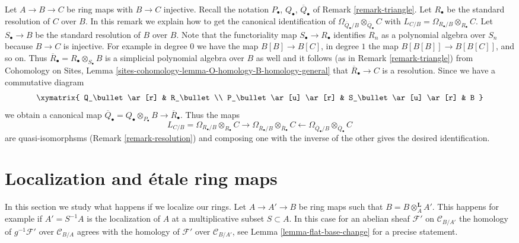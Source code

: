 \begin{remark}
\label{remark-explicit-map}
Let $A \to B \to C$ be ring maps with $B \to C$ injective.
Recall the notation $P_\bullet$, $Q_\bullet$, $\overline{Q}_\bullet$ of
Remark \ref{remark-triangle}.
Let $R_\bullet$ be the standard resolution of $C$ over $B$.
In this remark we explain how to get the canonical identification
of $\Omega_{\overline{Q}_\bullet/B} \otimes_{\overline{Q}_\bullet} C$
with $L_{C/B} = \Omega_{R_\bullet/B} \otimes_{R_\bullet} C$.
Let $S_\bullet \to B$ be the standard resolution of $B$ over $B$.
Note that the functoriality map $S_\bullet \to R_\bullet$ identifies
$R_n$ as a polynomial algebra over $S_n$ because $B \to C$ is injective.
For example in degree $0$ we have the map $B[B] \to B[C]$, in degree
$1$ the map $B[B[B]] \to B[B[C]]$, and so on. Thus
$\overline{R}_\bullet = R_\bullet \otimes_{S_\bullet} B$
is a simplicial polynomial algebra
over $B$ as well and it follows (as in Remark \ref{remark-triangle}) from
Cohomology on Sites, Lemma
\ref{sites-cohomology-lemma-O-homology-B-homology-general}
that $\overline{R}_\bullet \to C$ is a resolution. Since we have
a commutative diagram
$$
\xymatrix{
Q_\bullet \ar[r] & R_\bullet \\
P_\bullet \ar[u] \ar[r] & S_\bullet \ar[u] \ar[r] & B
}
$$
we obtain a canonical map
$\overline{Q}_\bullet = Q_\bullet \otimes_{P_\bullet} B \to
\overline{R}_\bullet$. Thus the maps
$$
L_{C/B} = \Omega_{R_\bullet/B} \otimes_{R_\bullet} C
\longrightarrow
\Omega_{\overline{R}_\bullet/B} \otimes_{\overline{R}_\bullet} C
\longleftarrow
\Omega_{\overline{Q}_\bullet/B} \otimes_{\overline{Q}_\bullet} C
$$
are quasi-isomorphsms (Remark \ref{remark-resolution}) and composing
one with the inverse of the other gives the desired identification.
\end{remark}





\section{Localization and \'etale ring maps}
\label{section-localization}

\noindent
In this section we study what happens if we localize our rings.
Let $A \to A' \to B$ be ring maps such that $B = B \otimes_A^\mathbf{L} A'$.
This happens for example if $A' = S^{-1}A$ is the localization of $A$
at a multiplicative subset $S \subset A$. In this
case for an abelian sheaf $\mathcal{F}'$ on $\mathcal{C}_{B/A'}$
the homology of $g^{-1}\mathcal{F}'$ over $\mathcal{C}_{B/A}$ agrees with
the homology of $\mathcal{F}'$ over $\mathcal{C}_{B/A'}$, see
Lemma \ref{lemma-flat-base-change} for a precise statement.

